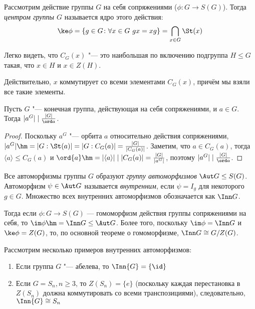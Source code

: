 \begin{definition}
	Рассмотрим действие группы $G$ на себя сопряжениями ($\phi \colon G \to S(G)$). Тогда \textit{центром группы $G$} называется ядро этого действия:
	\[
		\ke\phi = \{g \in G \colon \forall x \in G\ gx = xg\} = \bigcap_{x \in G} \St(x)
	\]
\end{definition}

\begin{note}
	Легко видеть, что $C_G(x)$ "--- это наибольшая по включению подгруппа $H \le G$ такая, что $x \in H$ и $x \in Z(H)$.
	
	Действительно, $x$ коммутирует со всеми элементами $C_G(x)$, причём мы взяли все такие элементы.
\end{note}

\begin{proposition}
	Пусть $G$ "--- конечная группа, действующая на себя сопряжениями, и $a \in G$. Тогда $|a^G| \mid \frac{|G|}{\ord a}$.
\end{proposition}

\begin{proof}
	Поскольку $a^G$ "--- орбита $a$ относительно действия сопряжениями, $|a^G| \hm= |G : \St(a)| = |G : C_G(a)| = \frac{|G|}{|C_G(a)|}$. Заметим, что $a \in C_G(a)$, тогда $\langle a \rangle \le C_G(a)$ и $\ord{a} \hm= |\langle a \rangle| \mid |C_G(a)| = \frac{|G|}{|a^G|}$, поэтому $|a^G| \mid \frac{|G|}{\ord a}$.
\end{proof}

\begin{definition}
	Все автоморфизмы группы $G$ образуют \textit{группу автоморфизмов} $\Aut G \le S(G)$. Автоморфизм $\psi \in \Aut G$ называется \textit{внутренним}, если $\psi = I_g$ для некоторого $g \in G$. Множество всех внутренних автоморфизмов обозначается как $\Inn G$.
\end{definition}

\begin{note}
	Тогда если $\phi \colon G \to S(G)$ --- гомоморфизм действия группы сопряжениями на себя, то $\im\phi \hm= \Inn G \le \Aut G$. Более того, поскольку $\im\phi = \Inn G$ и $\ke\phi = Z(G)$, то, по основной теореме о гомоморфизме, $\Inn G \cong G / Z(G)$.
\end{note}

\begin{example}
	Рассмотрим несколько примеров внутренних автоморфизмов:
	\begin{enumerate}
		\item Если группа $G$ "--- абелева, то $\Inn{G} = \{\id\}$
		\item Если $G = S_n, n \ge 3$, то $Z(S_n) = \{e\}$ (поскольку каждая перестановка в $Z(S_n)$ должна коммутировать со всеми транспозициями), следовательно, $\Inn{G} \cong S_n$
	\end{enumerate}
\end{example}


